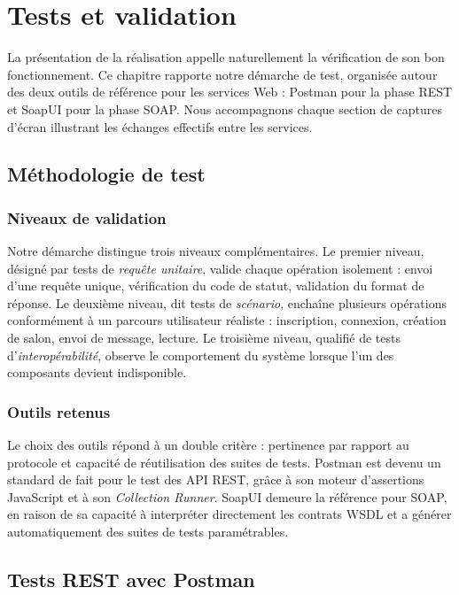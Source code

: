 \chapter{Tests et validation}

La présentation de la réalisation appelle naturellement la vérification de son bon fonctionnement. Ce chapitre rapporte notre démarche de test, organisée autour des deux outils de référence pour les services Web : Postman pour la phase REST et SoapUI pour la phase SOAP. Nous accompagnons chaque section de captures d'écran illustrant les échanges effectifs entre les services.

\section{Méthodologie de test}

\subsection{Niveaux de validation}

Notre démarche distingue trois niveaux complémentaires. Le premier niveau, désigné par tests de \emph{requête unitaire}, valide chaque opération isolement : envoi d'une requête unique, vérification du code de statut, validation du format de réponse. Le deuxième niveau, dit tests de \emph{scénario}, enchaîne plusieurs opérations conformément à un parcours utilisateur réaliste : inscription, connexion, création de salon, envoi de message, lecture. Le troisième niveau, qualifié de tests d'\emph{interopérabilité}, observe le comportement du système lorsque l'un des composants devient indisponible.

\subsection{Outils retenus}

Le choix des outils répond à un double critère : pertinence par rapport au protocole et capacité de réutilisation des suites de tests. Postman est devenu un standard de fait pour le test des API REST, grâce à son moteur d'assertions JavaScript et à son \emph{Collection Runner}. SoapUI demeure la référence pour SOAP, en raison de sa capacité à interpréter directement les contrats WSDL et a générer automatiquement des suites de tests paramétrables.

\section{Tests REST avec Postman}

